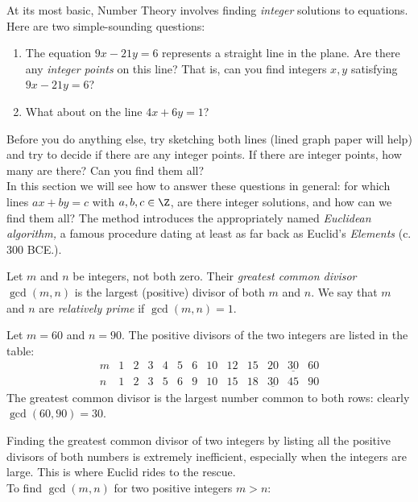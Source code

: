 At its most basic, Number Theory involves finding \emph{integer} solutions to equations. Here are two simple-sounding questions:
\begin{enumerate}
  \item The equation $9x-21y=6$ represents a straight line in the plane. Are there any \emph{integer points} on this line? That is, can you find integers $x,y$ satisfying $9x-21y=6$?
  \item What about on the line $4x+6y=1$?
\end{enumerate}
Before you do anything else, try sketching both lines (lined graph paper will help) and try to decide if there are any integer points. If there are integer points, how many are there? Can you find them all?\\

In this section we will see how to answer these questions in general: for which lines $ax+by=c$ with $a,b,c\in\Z$, are there integer solutions, and how can we find them all? The method introduces the appropriately named \emph{Euclidean algorithm,} a famous procedure dating at least as far back as Euclid's \emph{Elements} (c. 300 BCE.).

\begin{defn}
Let $m$ and $n$ be integers, not both zero. Their \emph{greatest common divisor} $\gcd(m,n)$ is the largest (positive) divisor of both $m$ and $n$. We say that $m$ and $n$ are \emph{relatively prime} if $\gcd(m,n)=1$.
\end{defn}

\begin{example}
Let $m=60$ and $n=90$. The positive divisors of the two integers are listed in the table:
\[\begin{array}{c|cccccccccccc}
m&1&2&3&4&5&6&10&12&15&20&\underline{30}&60\\\hline
n&1&2&3&5&6&9&10&15&18&\underline{30}&45&90
\end{array}\]
The greatest common divisor is the largest number common to both rows: clearly $\gcd(60,90)=30$.
\end{example}

Finding the greatest common divisor of two integers by listing all the positive divisors of both numbers is extremely inefficient, especially when the integers are large. This is where Euclid rides to the rescue.\\

 To find $\gcd(m,n)$ for two positive integers $m>n$:

